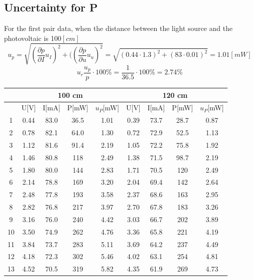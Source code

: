 \documentclass[12pt]{article}
\begin{document}
\subsection{Uncertainty for P}
For the first pair data, when the distance between the light source and the photovoltaic is 100$[cm]$
$$u_p=\sqrt{(\frac{\partial p}{\partial I}u_I)^2+((\frac{\partial p}{\partial u}u_u)^2}=\sqrt{(0.44\cdot1.3)^2+(83\cdot0.01)^2}=1.01[mW]$$
$$u_r\frac{u_p}{p}\cdot100\%=\frac{1}{36.5}\cdot100\%=2.74\%$$
\begin{table}[H]
\centering
\begin{tabular}{|c|c|c|c|c|c|c|c|c|}
\hline
   & \multicolumn{4}{c|}{100 cm}      & \multicolumn{4}{c|}{120 cm}      \\ \hline
   & U[V]        & I[mA]  &P[mW] &$u_P$[mW]     & U[V]        & I[mA]    &P[mW]&$u_P$[mW]    \\ \hline
1  & 0.44        & 83.0   &36.5&1.01     & 0.39        & 73.7     &28.7 &0.87   \\ \hline
2  & 0.78        & 82.1   &64.0&1.30     & 0.72        & 72.9     &52.5 &1.13    \\ \hline
3  & 1.12        & 81.6   &91.4&2.19     & 1.05        & 72.2     &75.8 &1.92    \\ \hline
4  & 1.46        & 80.8   &118 &2.49     & 1.38        & 71.5     &98.7 &2.19    \\ \hline
5  & 1.80        & 80.0   &144 &2.83     & 1.71        & 70.5     &120  &2.49    \\ \hline
6  & 2.14        & 78.8   &169 &3.20     & 2.04        & 69.4     &142  &2.64    \\ \hline
7  & 2.48        & 77.8   &193 &3.58     & 2.37        & 68.6     &163  &2.95    \\ \hline
8  & 2.82        & 76.8   &217 &3.97     & 2.70        & 67.8     &183  &3.26    \\ \hline
9  & 3.16        & 76.0   &240 &4.42     & 3.03        & 66.7     &202  &3.89    \\ \hline
10 & 3.50        & 74.9   &262 &4.76     & 3.36        & 65.8     &221  &4.19    \\ \hline
11 & 3.84        & 73.7   &283 &5.11     & 3.69        & 64.2     &237  &4.49    \\ \hline
12 & 4.18        & 72.3   &302 &5.46     & 4.02        & 63.1     &254  &4.81    \\ \hline
13 & 4.52        & 70.5   &319 &5.82     & 4.35        & 61.9     &269  &4.73    \\ \hline

\end{tabular}
\end{table}
\end{document}
